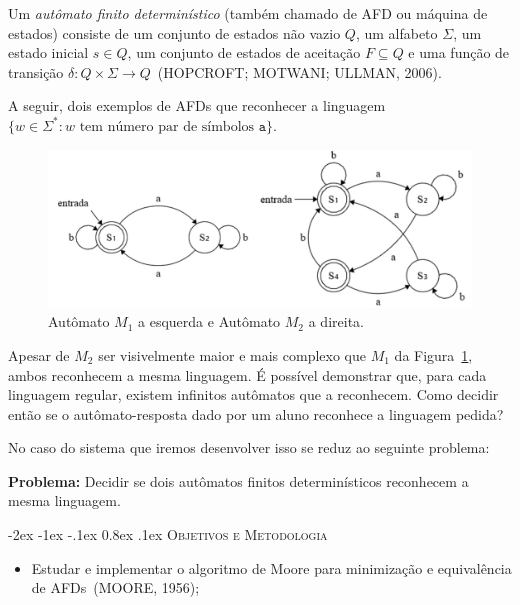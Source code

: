 \documentclass[plainsections, a0,  25pt]{sciposter} %
\makeatletter
\newcommand{\largo}{\fontsize{36}{40}\selectfont } %
\renewcommand\section{\@startsection {section}{1}{\z@}%
                                   {-2ex \@plus -1ex \@minus -.1ex}%
                                   {0.8ex \@plus.1ex}%
                                   {\normalfont\largo\bfseries}}
\makeatother
\begin{document}
\begin{multicols}{3}
Um \textit{autômato finito determinístico} (também chamado de AFD ou máquina de estados) consiste de um conjunto de estados não vazio $Q$, um alfabeto $\Sigma$, um estado inicial $s \in Q$, um conjunto de estados de aceitação $F \subseteq Q$ e uma função de transição $\delta \colon Q \times \Sigma \rightarrow Q$~(HOPCROFT; MOTWANI; ULLMAN, 2006).

A seguir, dois exemplos de AFDs que reconhecer a linguagem
$\{w \in \Sigma^* :  w \text{ tem número par de símbolos } \mathtt{a}\}$.

\begin{figure}
  \centering
  \includegraphics[width=\linewidth]{exemplo.png}
  \caption{Autômato $M_1$ a esquerda e Autômato $M_2$ a direita.}
  \label{fig:exemplo}
  \vspace{-2cm}
\end{figure}

Apesar de $M_2$ ser visivelmente maior e mais complexo que $M_1$ da Figura~\ref{fig:exemplo}, ambos reconhecem a mesma linguagem. É possível demonstrar que, para cada linguagem regular, existem infinitos autômatos que a reconhecem. Como decidir então se o autômato-resposta dado por um aluno reconhece a linguagem pedida? 

No caso do sistema que iremos desenvolver isso se reduz ao seguinte problema:
  
  
{\LARGE
  \noindent\textbf{Problema:} Decidir se dois autômatos finitos determinísticos reconhecem a mesma linguagem.\par
}

\columnbreak



\section{\textsc{Objetivos e Metodologia}}

\begin{itemize}
\item Estudar e implementar o algoritmo de Moore para minimização e equivalência de AFDs~(MOORE, 1956);


\end{itemize}
\end{multicols}
\end{document}
